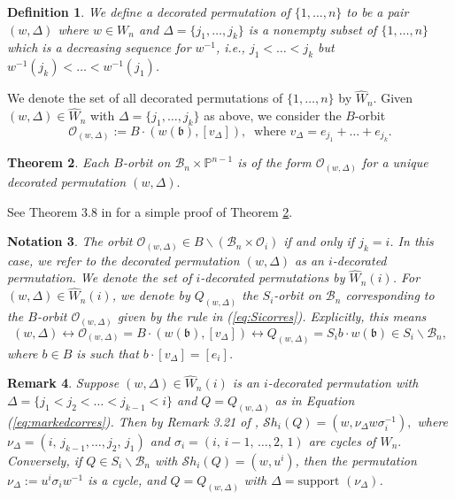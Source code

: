 \documentclass[12pt]{amsart}
\numberwithin{equation}{section}
\newtheorem{thm}{Theorem}[section]
\newtheorem{rem}[thm]{Remark}
\newtheorem{nota}[thm]{Notation}
\newtheorem{dfn}[thm]{Definition}
\newcommand{\Wn}{{W}_n}
\newcommand{\cW}{{ W}}
\newcommand{\fb}{\mbox{${\mathfrak b}$}}
\newcommand{\B}{\mathcal{B}}
\newcommand{\Sh}{\mathcal{S}h}
\newcommand{\calO}{\mathcal{O}}
\begin{document}
 \begin{dfn}\label{d:marked}
We define a \emph{decorated permutation} of $\{1,\dots, n\}$ to be a pair $(w,\Delta)$ where $w\in\Wn$ and $\Delta=\{j_{1},\dots, j_{k}\}$ is a nonempty subset of $\{1,\dots,n\}$ which is a decreasing sequence for $w^{-1}$, i.e., $j_1 < \dots < j_{k}$ but $w^{-1}(j_{k})<\dots< w^{-1}(j_{1})$.
\end{dfn}

We denote the set of all decorated permutations of $\{1,\dots, n\}$ by $\widehat{\cW}_{n}$.  Given  $(w,\Delta) \in \widehat{\cW}_{n}$ with 
$\Delta=\{j_{1},\dots, j_{k}\}$ as above,
 we consider the $B$-orbit 
\[
{\mathcal{O}}_{(w,\Delta)}:= B\cdot (w(\fb), [v_{\Delta}]), \ \text{ where } v_{\Delta}=e_{j_1}+\dots + e_{j_k}.
\]

\begin{thm}\label{thm:magyar}\cite{Magyar}
Each $B$-orbit on $\B_{n}\times\mathbb{P}^{n-1}$ is of the form ${\mathcal{O}}_{(w,\Delta)}$ for a unique decorated permutation $(w,\Delta).$
\end{thm}
 
 \noindent See Theorem 3.8 in \cite{Siorbits} for a simple proof of Theorem \ref{thm:magyar}.
 
 
 \begin{nota} \label{n:marked}  The orbit ${\mathcal O}_{(w,\Delta)}\in B\backslash(\B_{n}\times\mathcal{O}_{i})$ if and only if $j_{k}=i$.  In this case, we refer to the decorated permutation $(w,\Delta)$ as an $i$-decorated permutation.  We denote the set of $i$-decorated permutations by $\widehat{\cW}_{n}(i)$.  For $(w,\Delta)\in \widehat{\cW}_{n}(i)$, we denote by $Q_{(w,\Delta)}$ the  $S_{i}$-orbit on $\B_{n}$ corresponding to the $B$-orbit $\mathcal{O}_{(w,\Delta)}$ given by the rule in (\ref{eq:Sicorres}).  Explicitly, this means
\begin{equation}\label{eq:markedcorres}
(w,\Delta)\leftrightarrow \calO_{(w,\Delta)}=B\cdot (w(\fb), [v_{\Delta}])\leftrightarrow Q_{(w,\Delta)}= S_{i} b\cdot w(\fb) \in S_{i}\backslash\B_{n},
\end{equation}
where $b\in B$ is such that $b\cdot [v_{\Delta}]=[e_{i}]$.

\end{nota}

\begin{rem}\label{rem:iShform}
Suppose $(w,\Delta)\in \widehat{\cW}_{n}(i)$ is an $i$-decorated permutation with $\Delta=\{j_{1}<j_{2}<\dots< j_{k-1}<i\}$ and $Q=Q_{(w,\Delta)}$ as in Equation (\ref{eq:markedcorres}).  Then by Remark 3.21 of \cite{Siorbits}, $\Sh_{i}(Q)=(w, \nu_{\Delta} w\sigma_{i}^{-1}),$ where 
$\nu_{\Delta}=(i, \, j_{k-1},\dots, j_{2},\, j_{1})$ and $\sigma_{i}=(i,\, i-1,\, \dots, 2,\, 1)$ are cycles of $\Wn.$  Conversely, if $Q\in S_{i}\backslash\B_{n}$ with $\Sh_{i}(Q)=(w,u^{i})$, then the permutation $\nu_{\Delta}:=u^{i}\sigma_{i}w^{-1}$ is a cycle, and $Q=Q_{(w,\Delta)}$ with $\Delta=\mbox{support }({\nu_{\Delta}})$.
\end{rem}
 
\end{document}
